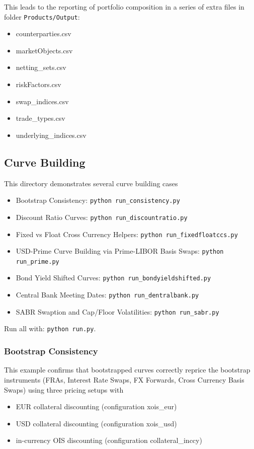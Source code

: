 This leads to the reporting of portfolio composition in a series of extra files in folder {\tt Products/Output}:
\begin{itemize}
\item counterparties.csv
\item marketObjects.csv
\item netting\_sets.csv
\item riskFactors.csv
\item swap\_indices.csv
\item trade\_types.csv
\item underlying\_indices.csv
\end{itemize}

\subsection{Curve Building}

This directory demonstrates several curve building cases
\begin{itemize}
\item Bootstrap Consistency: {\tt python run\_consistency.py}
\item Discount Ratio Curves: {\tt python run\_discountratio.py}
\item Fixed vs Float Cross Currency Helpers: {\tt python run\_fixedfloatccs.py}
\item USD-Prime Curve Building via Prime-LIBOR Basis Swaps: {\tt python run\_prime.py}
\item Bond Yield Shifted Curves: {\tt python run\_bondyieldshifted.py}
\item Central Bank Meeting Dates: {\tt python run\_dentralbank.py}
\item SABR Swaption and Cap/Floor Volatilities: {\tt python run\_sabr.py}
\end{itemize}

Run all with: {\tt python run.py}.

\subsubsection{Bootstrap Consistency}

This example confirms that bootstrapped curves correctly reprice the bootstrap instruments
(FRAs, Interest Rate Swaps, FX Forwards, Cross Currency Basis Swaps) using three pricing setups with
\begin{itemize}
\item EUR collateral discounting (configuration xois\_eur)
\item USD collateral discounting (configuration xois\_usd)
\item in-currency OIS discounting (configuration collateral\_inccy)
\end{itemize}

